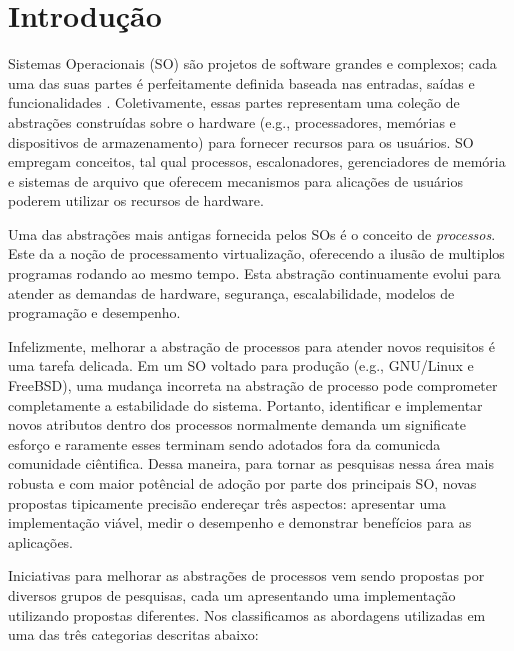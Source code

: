 \chapter{Introdução}
\label{cap:introducao}

Sistemas Operacionais (SO) são projetos de software grandes e complexos; cada
uma das suas partes é perfeitamente definida baseada nas entradas, saídas e
funcionalidades \cite{silberschatz}. Coletivamente, essas partes representam
uma coleção de abstrações construídas sobre o hardware (e.g., processadores,
memórias e dispositivos de armazenamento) para fornecer recursos para os
usuários. SO empregam conceitos, tal qual processos, escalonadores,
gerenciadores de memória e sistemas de arquivo que oferecem mecanismos para
alicações de usuários poderem utilizar os recursos de hardware.

Uma das abstrações mais antigas fornecida pelos SOs é o conceito de
\emph{processos}. Este da a noção de processamento virtualização, oferecendo a
ilusão de multiplos programas rodando ao mesmo tempo\cite{love, tanenbaum}.
Esta abstração continuamente evolui para atender as demandas de hardware,
segurança, escalabilidade, modelos de programação e desempenho.

Infelizmente, melhorar a abstração de processos para atender novos requisitos é
uma tarefa delicada. Em um SO voltado para produção (e.g., GNU/Linux e
FreeBSD), uma mudança incorreta na abstração de processo pode comprometer
completamente a estabilidade do sistema. Portanto, identificar e implementar
novos atributos dentro dos processos normalmente demanda um significate esforço
e raramente esses terminam sendo adotados fora da comunicda comunidade
ciêntifica. Dessa maneira, para tornar as pesquisas nessa área mais robusta e
com maior potêncial de adoção por parte dos principais SO, novas propostas
tipicamente precisão endereçar três aspectos: apresentar uma implementação
viável, medir o desempenho e demonstrar benefícios para as aplicações.

Iniciativas para melhorar as abstrações de processos vem sendo propostas por
diversos grupos de pesquisas, cada um apresentando uma implementação utilizando
propostas diferentes. Nos classificamos as abordagens utilizadas em uma das
três categorias descritas abaixo:

